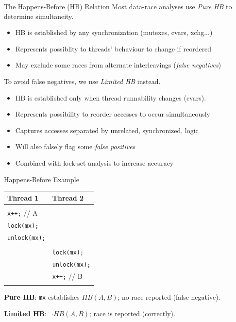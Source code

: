 \documentclass[xcolor=dvipsnames]{beamer}
\begin{document}
\begin{frame}{The Happens-Before (HB) Relation}
	Most data-race analyses use {\em Pure HB} to determine simultaneity.
	\begin{itemize}
		\item HB is established by any synchronization (mutexes, cvars, xchg...)
		\item Represents possiblity to threads' behaviour to change if reordered
		\item May exclude some races from alternate interleavings ({\em false negatives})
	\end{itemize}
	\pause
	\linegap

	To avoid false negatives, we use {\em Limited HB} instead.
	\begin{itemize}
		\item HB is established only when thread runnability changes (cvars).
		\item Represents possibility to reorder accesses to occur simultaneously
		\item Captures accesses separated by unrelated, synchronized, logic
		\item Will also falsely flag some {\em false positives}
		\item Combined with lock-set analysis to increase accuracy
	\end{itemize}
\end{frame}


\begin{frame}{Happens-Before Example}
	\begin{center}
		\begin{tabular}{|l|l|}
			\hline
			\cellcolor{thread1} {\bf Thread 1} & \cellcolor{thread2} {\bf Thread 2} \\
			\hline
			& \\
			\small \texttt{x++;} // A & \\
			\small \texttt{lock(mx);} & \\
			\small \texttt{unlock(mx);} & \\
			
			& \\
			& \small \texttt{lock(mx);} \\
			& \small \texttt{unlock(mx);} \\
			& \small \texttt{x++;} // B \\
			& \\
			\hline
		\end{tabular}
	\end{center}
	{\bf Pure HB}: \texttt{mx} establishes $HB(A, B)$; no race reported (false negative).
	\linegap

	{\bf Limited HB}: $\neg HB(A, B)$; race is reported (correctly).
\end{frame}
\end{document}
